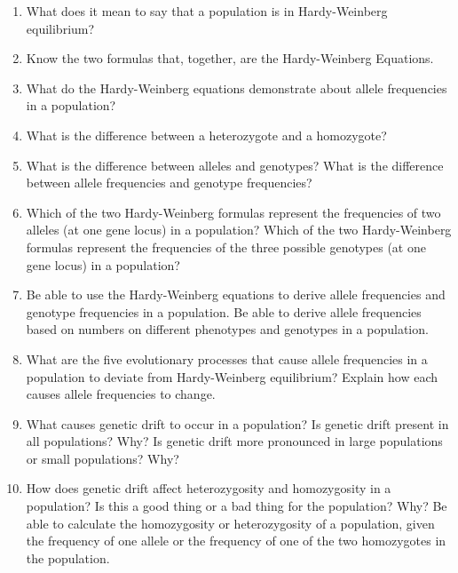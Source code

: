 \documentclass[letterpaper]{tufte-handout}
\begin{document}
\begin{enumerate}

	\item What does it mean to say that a population is in Hardy-Weinberg equilibrium?

	\item Know the two formulas that, together, are the Hardy-Weinberg Equations.

	\item What do the Hardy-Weinberg equations demonstrate about allele frequencies in a population?

	\item What is the difference between a heterozygote and a homozygote?

	\item What is the difference between alleles and genotypes?  What is the difference between allele frequencies and genotype frequencies?

	\item Which of the two Hardy-Weinberg formulas represent the frequencies of two alleles (at one gene locus) in a population?  Which of the two Hardy-Weinberg formulas represent the frequencies of the three possible genotypes (at one gene locus) in a population?

	\item Be able to use the Hardy-Weinberg equations to derive allele frequencies and genotype frequencies in a population.  Be able to derive allele frequencies based on numbers on different phenotypes and genotypes in a population. 

	\item What are the five evolutionary processes that cause allele frequencies in a population to deviate from Hardy-Weinberg equilibrium?  Explain how each causes allele frequencies to change.

	\item What causes genetic drift to occur in a population? Is genetic drift present in all populations? Why? Is genetic drift more pronounced in large populations or small populations?  Why?

	\item How does genetic drift affect heterozygosity and homozygosity in a population?  Is this a good thing or a bad thing for the population?  Why?  Be able to calculate the homozygosity or heterozygosity of a population, given the frequency of one allele or the frequency of one of the two homozygotes in the population. 


\end{enumerate}
\end{document}
